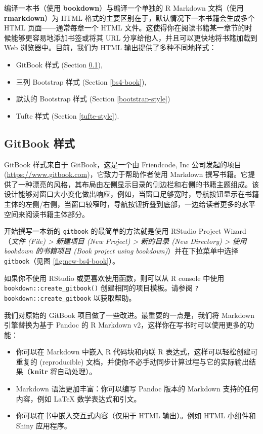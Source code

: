 \documentclass[
  12pt,
]{krantz}
\providecommand{\tightlist}{%
  \setlength{\itemsep}{0pt}\setlength{\parskip}{0pt}}
\theoremstyle{definition}
\theoremstyle{definition}
\theoremstyle{definition}
\theoremstyle{definition}
\theoremstyle{remark}
\begin{document}
编译一本书（使用 \textbf{bookdown}）与编译一个单独的 R Markdown 文档（使用 \textbf{rmarkdown}）为 HTML 格式的主要区别在于，默认情况下一本书籍会生成多个 HTML 页面------通常每章一个 HTML 文件。这使得你在阅读书籍某一章节的时候能够更容易地添加书签或将其 URL 分享给他人，并且可以更快地将书籍加载到 Web 浏览器中。目前，我们为 HTML 输出提供了多种不同地样式：

\begin{itemize}
\tightlist
\item
  GitBook 样式 (Section \ref{gitbook-style}),
\item
  三列 Bootstrap 样式 (Section \ref{bs4-book}),
\item
  默认的 Bootstrap 样式 (Section \ref{bootstrap-style})
\item
  Tufte 样式 (Section \ref{tufte-style}).
\end{itemize}

\subsection{GitBook 样式}\label{gitbook-style}

GitBook 样式来自于 GitBook，这是一个由 Friendcode, Inc 公司发起的项目 (\url{https://www.gitbook.com})，它致力于帮助作者使用 Markdown 撰写书籍。它提供了一种漂亮的风格，其布局由左侧显示目录的侧边栏和右侧的书籍主题组成。该设计能够对窗口大小变化做出响应，例如，当窗口足够宽时，导航按钮显示在书籍主体的左侧/右侧，当窗口较窄时，导航按钮折叠到底部，一边给读者更多的水平空间来阅读书籍主体部分。

开始撰写一本新的 \texttt{gitbook} 的最简单的方法就是使用 RStudio Project Wizard（\emph{文件 (File) \textgreater{} 新建项目 (New Project) \textgreater{} 新的目录 (New Directory) \textgreater{} 使用 bookdown 的书籍项目 (Book project using bookdown)}）并在下拉菜单中选择 \texttt{gitbook}（见图 \ref{fig:new-bs4-book}）。

如果你不使用 RStudio 或更喜欢使用函数，则可以从 R console 中使用 \texttt{bookdown::create\_gitbook()} 创建相同的项目模板。请参阅 \texttt{?bookdown::create\_gitbook} 以获取帮助。

我们对原始的 GitBook 项目做了一些改进。最重要的一点是，我们将 Markdown 引擎替换为基于 Pandoc 的 R Markdown v2，这样你在写书时可以使用更多的功能：

\begin{itemize}
\tightlist
\item
  你可以在 Markdown 中嵌入 R 代码块和内联 R 表达式，这样可以轻松创建可重复的 (reproducible) 文档，并使你不必手动同步计算过程与它的实际输出结果（\textbf{knitr} 将自动处理）。
\item
  Markdown 语法更加丰富：你可以编写 Pandoc 版本的 Markdown 支持的任何内容，例如 LaTeX 数学表达式和引文。
\item
  你可以在书中嵌入交互式内容（仅用于 HTML 输出）。例如 HTML 小组件和 Shiny 应用程序。
\end{itemize}
\end{document}

